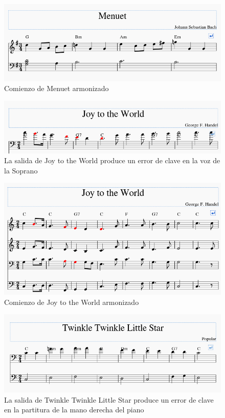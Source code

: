     \begin{figure}
    	\centering
    	\includegraphics[width=0.8\linewidth]{imagenes/evaluation/menuet_harm.png}
    	\caption{Comienzo de Menuet armonizado}
    	\label{fig:menuet_harm}
    \end{figure}
  
        \begin{figure}
        	\centering
        	\includegraphics[width=0.8\linewidth]{imagenes/evaluation/joy_harm_err.png}
        	\caption{La salida de Joy to the World produce un error de clave en la voz de la Soprano}
        	\label{fig:joy_harm_err}
        \end{figure}
     
      \begin{figure}
      	\centering
      	\includegraphics[width=0.8\linewidth]{imagenes/evaluation/joy_harm.png}
      	\caption{Comienzo de Joy to the World armonizado}
      	\label{fig:joy_harm}
      \end{figure}
  
    \begin{figure}
    	\centering
    	\includegraphics[width=0.8\linewidth]{imagenes/evaluation/twinkle_harm_err.png}
    	\caption{La salida de Twinkle Twinkle Little Star produce un error de clave en la partitura de la mano derecha del piano}
    	\label{fig:twinkle_harm_err}
    \end{figure}
    
